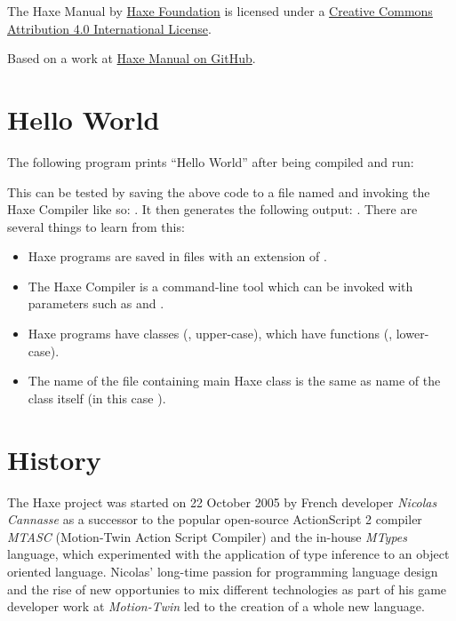 The Haxe Manual by \href{http://haxe.org/foundation}{Haxe Foundation} is licensed under a \href{http://creativecommons.org/licenses/by/4.0/}{Creative Commons Attribution 4.0 International License}.

Based on a work at \href{https://github.com/HaxeFoundation/HaxeManual}{Haxe Manual on GitHub}.

\section{Hello World}
\label{introduction-hello-world}

The following program prints ``Hello World'' after being compiled and run:

This can be tested by saving the above code to a file named  and invoking the Haxe Compiler like so: . It then generates the following output: . There are several things to learn from this:

\begin{itemize}
	\item Haxe programs are saved in files with an extension of .
	\item The Haxe Compiler is a command-line tool which can be invoked with parameters such as  and .
	\item Haxe programs have classes (, upper-case), which have functions (, lower-case). 
	\item The name of the file containing main Haxe class is the same as name of the class itself (in this case ). 
\end{itemize}

\section{History}
\label{introduction-haxe-history}

The Haxe project was started on 22 October 2005 by French developer \emph{Nicolas Cannasse} as a successor to the popular open-source ActionScript 2 compiler \emph{MTASC} (Motion-Twin Action Script Compiler) and the in-house \emph{MTypes} language, which experimented with the application of type inference to an object oriented language. Nicolas' long-time passion for programming language design and the rise of new opportunies to mix different technologies as part of his game developer work at \emph{Motion-Twin} led to the creation of a whole new language.

